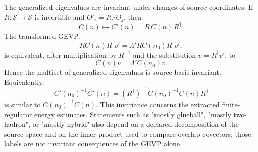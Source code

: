 The generalized eigenvalues are invariant under changes of source
coordinates.  If \(R:\mathcal S\to\mathcal S\) is invertible and
\(O'_i=R_i{}^jO_j\), then
\begin{equation}
  C(n)\longmapsto C'(n)=R\,C(n)\,R^\dagger .
  \label{eq:finite-volume-source-basis-change}
\end{equation}
The transformed GEVP,
\[
  R C(n)R^\dagger v'
  =
  \Lambda' R C(n_0)R^\dagger v',
\]
is equivalent, after multiplication by \(R^{-1}\) and the substitution
\(v=R^\dagger v'\), to
\[
  C(n)v=\Lambda' C(n_0)v .
\]
Hence the multiset of generalized eigenvalues is source-basis invariant.
Equivalently,
\[
  C'(n_0)^{-1}C'(n)
  =
  (R^\dagger)^{-1}C(n_0)^{-1}C(n)R^\dagger
\]
is similar to \(C(n_0)^{-1}C(n)\).  This invariance concerns the extracted
finite-regulator energy estimates.  Statements such as "mostly glueball",
"mostly two-hadron", or "mostly hybrid" also depend on a declared
decomposition of the source space and on the inner product used to compare
overlap covectors; those labels are not invariant consequences of the GEVP
alone.


